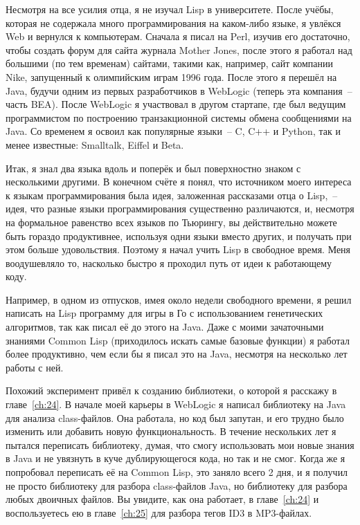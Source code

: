 Несмотря на все усилия отца, я не изучал Lisp в университете. После учёбы, которая
не содержала много программирования на каком-либо языке, я увлёкся Web и вернулся к
компьютерам. Сначала я писал на Perl, изучив его достаточно, чтобы создать форум для сайта
журнала Mother Jones, после этого я работал над большими (по тем временам) сайтами,
такими как, например, сайт компании Nike, запущенный к олимпийским играм 1996 года. После
этого я перешёл на Java, будучи одним из первых разработчиков в WebLogic (теперь эта
компания~-- часть BEA). После WebLogic я участвовал в другом стартапе, где был ведущим
программистом по построению транзакционной системы обмена сообщениями на Java. Со временем
я освоил как популярные языки~-- C, C++ и Python, так и менее известные: Smalltalk, Eiffel и Beta.

Итак, я знал два языка вдоль и поперёк и был поверхностно знаком с несколькими другими.
В конечном счёте я понял, что источником моего интереса к языкам программирования
была идея, заложенная рассказами отца о Lisp,~-- идея, что разные языки
программирования существенно различаются, и, несмотря на формальное равенство всех языков
по Тьюрингу, вы действительно можете быть гораздо продуктивнее, используя
одни языки вместо других, и получать при этом больше удовольствия. Поэтому я начал учить
Lisp в свободное время. Меня воодушевляло то, насколько быстро я проходил путь от идеи к
работающему коду.

Например, в одном из отпусков, имея около недели свободного времени, я решил написать
на Lisp программу для игры в Го с использованием генетических алгоритмов, так как писал её
до этого на Java. Даже с моими зачаточными знаниями Common Lisp (приходилось искать
самые базовые функции) я работал более продуктивно, чем если бы я писал это на Java,
несмотря на несколько лет работы с ней.

Похожий эксперимент привёл к созданию библиотеки, о которой я расскажу в главе~\ref{ch:24}. В
начале моей карьеры в WebLogic я написал библиотеку на Java для анализа class-файлов.
Она работала, но код был запутан, и его трудно было изменить или добавить новую функциональность.
В течение нескольких лет я пытался переписать библиотеку,
думая, что смогу использовать мои новые знания в Java и не увязнуть в куче дублирующегося
кода, но так и не смог. Когда же я попробовал переписать её на Common Lisp, это заняло всего
2 дня, и я получил не просто библиотеку для разбора class-файлов Java, но библиотеку для
разбора любых двоичных файлов. Вы увидите, как она работает, в главе~\ref{ch:24} и воспользуетесь
ею в главе~\ref{ch:25} для разбора тегов ID3 в MP3-файлах.

